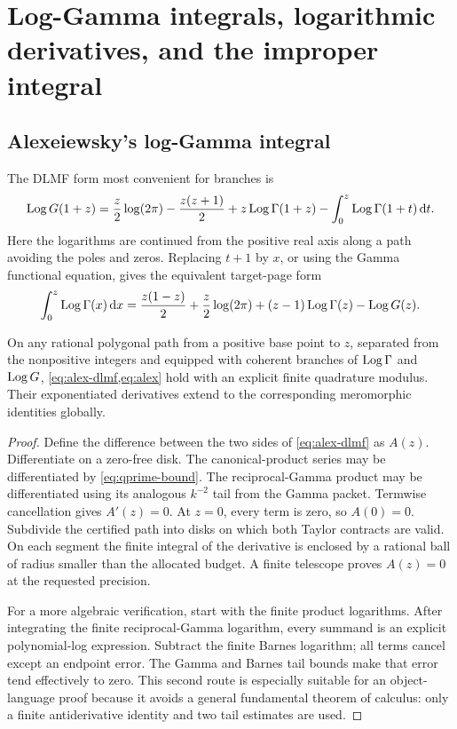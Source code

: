 \section{Log-Gamma integrals, logarithmic derivatives, and the improper integral}\label{sec:integrals}

\subsection{Alexeiewsky's log-Gamma integral}

The DLMF form most convenient for branches is
\begin{equation}\label{eq:alex-dlmf}
 \operatorname{Log} G(1+z)=\frac z2\log(2\pi)-\frac{z(z+1)}2
 +z\operatorname{Log}\Gamma(1+z)-\int_0^z\operatorname{Log}\Gamma(1+t)\,\mathrm d t.
\end{equation}
Here the logarithms are continued from the positive real axis along a path
avoiding the poles and zeros.  Replacing \(t+1\) by \(x\), or using the Gamma
functional equation, gives the equivalent target-page form
\begin{equation}\label{eq:alex}
 \int_0^z\operatorname{Log}\Gamma(x)\,\mathrm d x
 =\frac{z(1-z)}2+\frac z2\log(2\pi)
 +(z-1)\operatorname{Log}\Gamma(z)-\operatorname{Log} G(z).
\end{equation}

\begin{theorem}\label{thm:alex}
On any rational polygonal path from a positive base point to \(z\), separated
from the nonpositive integers and equipped with coherent branches of
\(\operatorname{Log}\Gamma\) and \(\operatorname{Log} G\), \cref{eq:alex-dlmf,eq:alex} hold with an
explicit finite quadrature modulus.  Their exponentiated derivatives extend to
the corresponding meromorphic identities globally.
\end{theorem}

\begin{proof}
Define the difference between the two sides of \cref{eq:alex-dlmf} as
\(A(z)\).  Differentiate on a zero-free disk.  The canonical-product series
may be differentiated by \cref{eq:qprime-bound}.  The reciprocal-Gamma product
may be differentiated using its analogous \(k^{-2}\) tail from the Gamma
packet.  Termwise cancellation gives \(A'(z)=0\).  At \(z=0\), every term is
zero, so \(A(0)=0\).  Subdivide the certified path into disks on which both
Taylor contracts are valid.  On each segment the finite integral of the
derivative is enclosed by a rational ball of radius smaller than the allocated
budget.  A finite telescope proves \(A(z)=0\) at the requested precision.

For a more algebraic verification, start with the finite product logarithms.
After integrating the finite reciprocal-Gamma logarithm, every summand is an
explicit polynomial-log expression.  Subtract the finite Barnes logarithm;
all terms cancel except an endpoint error.  The Gamma and Barnes tail bounds
make that error tend effectively to zero.  This second route is especially
suitable for an object-language proof because it avoids a general fundamental
theorem of calculus: only a finite antiderivative identity and two tail
estimates are used.
\end{proof}

